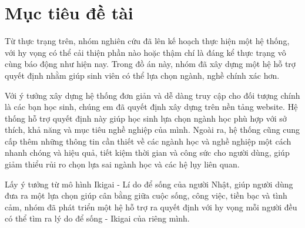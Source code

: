 \section{Mục tiêu đề tài}
    Từ thực trạng trên, nhóm nghiên cứu đã lên kế hoạch thực hiện một hệ thống, với hy vọng có thể cải thiện phần nào hoặc thậm chí là đáng kể thực trạng vô cùng báo động như hiện nay. Trong đồ án này, nhóm đã xây dựng một hệ hỗ trợ quyết định nhằm giúp sinh viên có thể lựa chọn ngành, nghề chính xác hơn.
    
    Với ý tưởng xây dựng hệ thống đơn giản và dễ dàng truy cập cho đối tượng chính là các bạn học sinh, chúng em đã quyết định xây dựng trên nền tảng website. Hệ thống hỗ trợ quyết định này giúp học sinh lựa chọn ngành học phù hợp với sở thích, khả năng và mục tiêu nghề nghiệp của mình. Ngoài ra, hệ thống cũng cung cấp thêm những thông tin cần thiết về các ngành học và nghề nghiệp một cách nhanh chóng và hiệu quả, tiết kiệm thời gian và công sức cho người dùng, giúp giảm thiểu rủi ro chọn lựa sai ngành học và các hệ lụy liên quan.
    
    Lấy ý tưởng từ mô hình Ikigai - Lí do để sống của người Nhật, giúp người dùng đưa ra một lựa chọn giúp cân bằng giữa cuộc sống, công việc, tiền bạc và tình cảm, nhóm đã phát triển một hệ hỗ trợ ra quyết định với hy vọng mỗi người đều có thể tìm ra lý do để sống - Ikigai của riêng mình.
